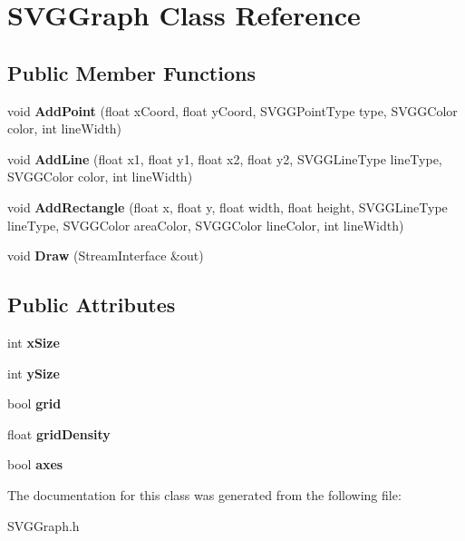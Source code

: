 \hypertarget{classSVGGraph}{
\section{SVGGraph Class Reference}
\label{classSVGGraph}
}
\subsection*{Public Member Functions}
\begin{DoxyCompactItemize}
\item 
\hypertarget{classSVGGraph_af9021475ffc34852a1a3e2a5ba18f4fc}{
void {\bfseries AddPoint} (float xCoord, float yCoord, SVGGPointType type, SVGGColor color, int lineWidth)}
\label{classSVGGraph_af9021475ffc34852a1a3e2a5ba18f4fc}

\item 
\hypertarget{classSVGGraph_a642fa30fa185765503ea997720255f23}{
void {\bfseries AddLine} (float x1, float y1, float x2, float y2, SVGGLineType lineType, SVGGColor color, int lineWidth)}
\label{classSVGGraph_a642fa30fa185765503ea997720255f23}

\item 
\hypertarget{classSVGGraph_a519f5d1c9dcc2ea906e7b778826419cf}{
void {\bfseries AddRectangle} (float x, float y, float width, float height, SVGGLineType lineType, SVGGColor areaColor, SVGGColor lineColor, int lineWidth)}
\label{classSVGGraph_a519f5d1c9dcc2ea906e7b778826419cf}

\item 
\hypertarget{classSVGGraph_a97af80ab95d6713fc8d44327edbc2218}{
void {\bfseries Draw} (StreamInterface \&out)}
\label{classSVGGraph_a97af80ab95d6713fc8d44327edbc2218}

\end{DoxyCompactItemize}
\subsection*{Public Attributes}
\begin{DoxyCompactItemize}
\item 
\hypertarget{classSVGGraph_aef84f037dd29dcc5e12226b301dacc7a}{
int {\bfseries xSize}}
\label{classSVGGraph_aef84f037dd29dcc5e12226b301dacc7a}

\item 
\hypertarget{classSVGGraph_ac290e5e0d59a084595fc8b60cc294f53}{
int {\bfseries ySize}}
\label{classSVGGraph_ac290e5e0d59a084595fc8b60cc294f53}

\item 
\hypertarget{classSVGGraph_a07c3706546682b7c7c7b2cb40780f6ab}{
bool {\bfseries grid}}
\label{classSVGGraph_a07c3706546682b7c7c7b2cb40780f6ab}

\item 
\hypertarget{classSVGGraph_a27248988a8b47ebe081b3f5117e37d6c}{
float {\bfseries gridDensity}}
\label{classSVGGraph_a27248988a8b47ebe081b3f5117e37d6c}

\item 
\hypertarget{classSVGGraph_ac7c7add94463436bdb5c4f30c1863b68}{
bool {\bfseries axes}}
\label{classSVGGraph_ac7c7add94463436bdb5c4f30c1863b68}

\end{DoxyCompactItemize}


The documentation for this class was generated from the following file:\begin{DoxyCompactItemize}
\item 
SVGGraph.h\end{DoxyCompactItemize}
